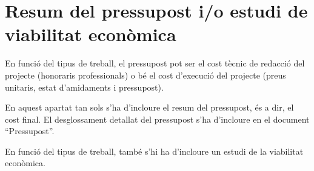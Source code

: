 \chapter{Resum del pressupost i/o estudi de viabilitat econòmica}

En funció del tipus de treball, el pressupost pot ser el cost tècnic de redacció del projecte (honoraris professionals) o bé el cost d’execució del projecte (preus unitaris, estat d’amidaments i pressupost).

En aquest apartat tan sols s’ha d’incloure el resum del pressupost, és a dir, el cost final. El desglossament detallat del pressupost s’ha d’incloure en el document “Pressupost”.

En funció del tipus de treball, també s’hi ha d’incloure un estudi de la viabilitat econòmica.
